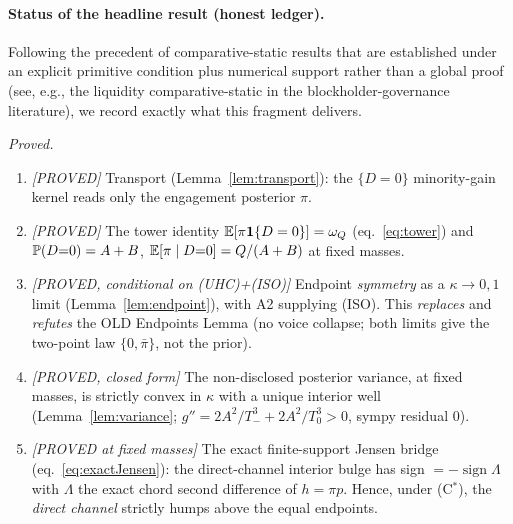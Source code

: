 \paragraph{Status of the headline result (honest ledger).}
Following the precedent of comparative-static results that are established under an
explicit primitive condition plus numerical support rather than a global proof
(see, e.g., the liquidity comparative-static in the blockholder-governance
literature), we record exactly what this fragment delivers.

\noindent\emph{Proved.}
\begin{enumerate}
\item \emph{[PROVED]} Transport (Lemma~\ref{lem:transport}): the $\{D=0\}$
      minority-gain kernel reads only the engagement posterior $\pi$.
\item \emph{[PROVED]} The tower identity $\mathbb{E}[\pi\mathbf{1}\{D=0\}]=\omega_Q$
      (eq.~\ref{eq:tower}) and $\mathbb{P}(D{=}0)=A+B$, $\mathbb{E}[\pi\mid D{=}0]=Q/(A+B)$ at
      fixed masses.
\item \emph{[PROVED, conditional on (UHC)+(ISO)]} Endpoint \emph{symmetry} as a
      $\kappa\to0,1$ limit (Lemma~\ref{lem:endpoint}), with A2 supplying (ISO).
      This \emph{replaces} and \emph{refutes} the OLD Endpoints Lemma (no voice
      collapse; both limits give the two-point law $\{0,\bar\pi\}$, not the prior).
\item \emph{[PROVED, closed form]} The non-disclosed posterior variance, at fixed
      masses, is strictly convex in $\kappa$ with a unique interior well
      (Lemma~\ref{lem:variance}; $g''=2A^2/T_-^3+2A^2/T_0^3>0$, sympy residual $0$).
\item \emph{[PROVED at fixed masses]} The exact finite-support Jensen bridge
      (eq.~\ref{eq:exactJensen}): the direct-channel interior bulge has sign
      $=-\operatorname{sign}\Lambda$ with $\Lambda$ the exact chord second
      difference of $h=\pi p$. Hence, under (C$^\ast$), the \emph{direct channel}
      strictly humps above the equal endpoints.
\end{enumerate}

